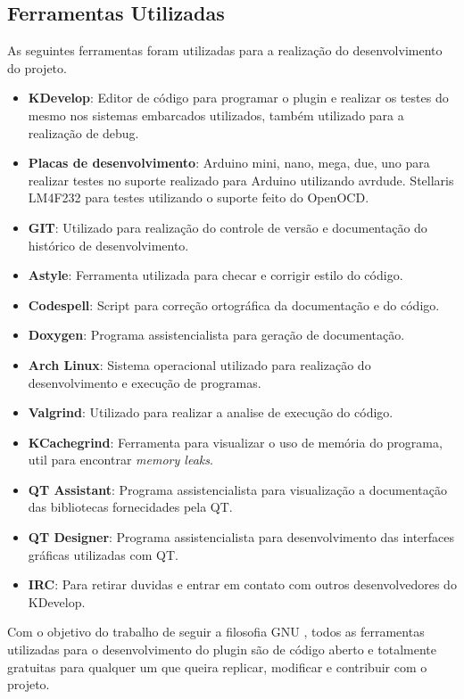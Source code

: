 \subsection{Ferramentas Utilizadas}
As seguintes ferramentas foram utilizadas para a realização do desenvolvimento do projeto.
\begin{itemize}
 \item \textbf{KDevelop}: Editor de código para programar o plugin e realizar os testes do mesmo nos sistemas embarcados utilizados,
 também utilizado para a realização de debug.
 \item \textbf{Placas de desenvolvimento}: Arduino mini, nano, mega, due, uno para realizar testes no suporte realizado para Arduino
 utilizando avrdude. Stellaris LM4F232 para testes utilizando o suporte feito do OpenOCD.
 \item \textbf{GIT}: Utilizado para realização do controle de versão e documentação do  histórico de desenvolvimento.
 \item \textbf{Astyle}: Ferramenta utilizada para checar e corrigir estilo do código.
 \item \textbf{Codespell}: Script para correção ortográfica da documentação e do código.
 \item \textbf{Doxygen}: Programa assistencialista para geração de documentação.
 \item \textbf{Arch Linux}: Sistema operacional utilizado para realização do desenvolvimento e execução de programas.
 \item \textbf{Valgrind}: Utilizado para realizar a analise de execução do código.
 \item \textbf{KCachegrind}: Ferramenta para visualizar o uso de memória do programa, util para encontrar \textit{memory leaks}.
 \item \textbf{QT Assistant}: Programa assistencialista para visualização a documentação das bibliotecas fornecidades pela QT.
 \item \textbf{QT Designer}: Programa assistencialista para desenvolvimento das interfaces gráficas utilizadas com QT.
 \item \textbf{IRC}: Para retirar duvidas e entrar em contato com outros desenvolvedores do KDevelop.
\end{itemize}

Com o objetivo do trabalho de seguir a filosofia GNU \cite{filosogia}, todos as ferramentas utilizadas para o desenvolvimento do plugin são de código aberto e totalmente gratuitas para qualquer um que queira replicar, modificar e contribuir com o projeto.

